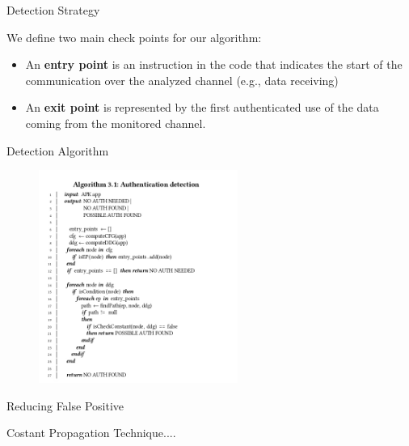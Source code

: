 \documentclass[10pt]{beamer}
\begin{document}
\begin{frame}[fragile]{Detection Strategy}

  We define two main check points for our algorithm:
  \begin{itemize}

  \item An {\bf entry point} is an instruction in the code that
      indicates the start of the communication over the analyzed
      channel (e.g., data receiving)

    \item An {\bf exit point} is represented by the first
      authenticated use of the data coming from the monitored channel.

   \end{itemize}
  
\end{frame}

\begin{frame}[fragile]{Detection Algorithm}

 \begin{figure}[bhp]
    \centering
	\includegraphics[width=65mm]{img/algo}
     \end{figure}
  
\end{frame}

\begin{frame}[fragile]{Reducing False Positive}

  Costant Propagation Technique....
  
\end{frame}



\end{document}
